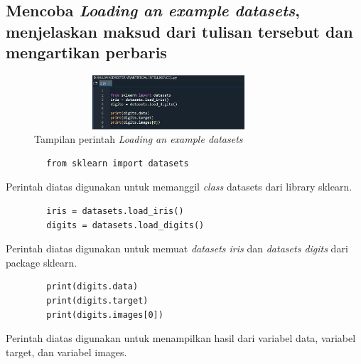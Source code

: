 \documentclass{article}
\begin{document}
\subsection{Mencoba \textit{Loading an example datasets}, menjelaskan maksud dari tulisan tersebut dan mengartikan perbaris}

     \begin{figure}[!htbp]
            \centering
            \includegraphics[width=10cm,height=2cm]{figures/1184101/chapter1/4.jpeg}
            \caption{Tampilan perintah \textit{Loading an example datasets}}
            \label{penanda}
            \end{figure}
    
    
        \begin{verbatim}
        from sklearn import datasets \end{verbatim}
        Perintah diatas digunakan untuk memanggil \textit{class} datasets dari library sklearn.
        \begin{verbatim}
        iris = datasets.load_iris()
        digits = datasets.load_digits() \end{verbatim}
        Perintah diatas digunakan untuk memuat \textit{datasets iris} dan \textit{datasets digits} dari package sklearn.
        \begin{verbatim}
        print(digits.data) 
        print(digits.target) 
        print(digits.images[0])
        \end{verbatim}
        Perintah diatas digunakan untuk menampilkan hasil dari variabel data, variabel target, dan variabel images.
    
\end{document}
